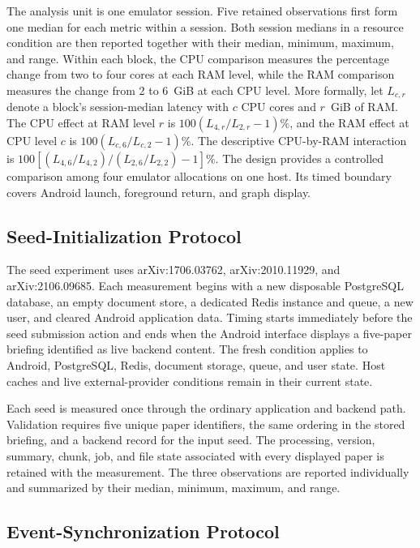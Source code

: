 The analysis unit is one emulator session. Five retained observations first
form one median for each metric within a session. Both session medians in a
resource condition are then reported together with their median, minimum,
maximum, and range. Within each block, the CPU comparison measures the
percentage change from two to four cores at each RAM level, while the RAM
comparison measures the change from 2 to 6~GiB at each CPU level. More
formally, let \(L_{c,r}\) denote a block's session-median latency with \(c\)
CPU cores and \(r\)~GiB of RAM. The CPU effect at RAM level \(r\) is
\(100(L_{4,r}/L_{2,r}-1)\%\), and the RAM effect at CPU level \(c\) is
\(100(L_{c,6}/L_{c,2}-1)\%\). The descriptive CPU-by-RAM interaction is
\(100[(L_{4,6}/L_{4,2})/(L_{2,6}/L_{2,2})-1]\%\).
The design provides a controlled comparison among four emulator allocations
on one host. Its timed boundary covers Android launch, foreground return, and
graph display.

\subsection{Seed-Initialization Protocol}

The seed experiment uses arXiv:1706.03762, arXiv:2010.11929, and
arXiv:2106.09685. Each measurement begins with a new disposable PostgreSQL
database, an empty document store, a dedicated Redis instance and queue, a new
user, and cleared Android application data. Timing starts immediately before
the seed submission action and ends when the Android interface displays a
five-paper briefing identified as live backend content.
The fresh condition applies to Android, PostgreSQL, Redis, document storage,
queue, and user state. Host caches and live external-provider conditions
remain in their current state.

Each seed is measured once through the ordinary application and backend path.
Validation requires five unique paper identifiers, the same ordering in the
stored briefing, and a backend record for the input seed. The processing,
version, summary, chunk, job, and file state associated with every displayed
paper is retained with the measurement. The three observations are reported
individually and summarized by their median, minimum, maximum, and range.

\subsection{Event-Synchronization Protocol}

